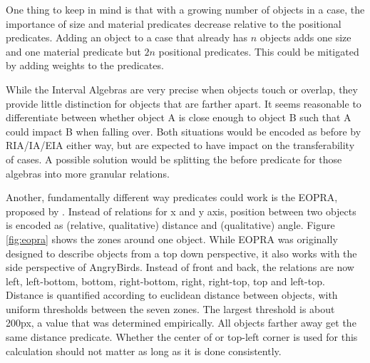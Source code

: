 One thing to keep in mind is that with a growing number of objects in a case, the importance of size and material predicates decrease relative to the positional predicates. Adding an object to a case that already has $n$ objects adds one size and one material predicate but $2n$ positional predicates. This could be mitigated by adding weights to the predicates.

While the Interval Algebras are very precise when objects touch or overlap, they provide little distinction for objects that are farther apart. It seems reasonable to differentiate between whether object A is close enough to object B such that A could impact B when falling over. Both situations would be encoded as before by RIA/IA/EIA either way, but are expected to have impact on the transferability of cases.
A possible solution would be splitting the before predicate for those algebras into more granular relations.

Another, fundamentally different way predicates could work is the \ac{EOPRA}, proposed by \cite{EOPRA-Perico2016CollaborativeCO}. Instead of relations for x and y axis, position between two objects is encoded as (relative, qualitative) distance and (qualitative) angle.
Figure \ref{fig:eopra} shows the zones around one object. While \ac{EOPRA} was originally designed to describe objects from a top down perspective, it also works with the side perspective of AngryBirds.
Instead of front and back, the relations are now left, left-bottom, bottom, right-bottom, right, right-top, top and left-top.
Distance is quantified according to euclidean distance between objects, with uniform thresholds between the seven zones. The largest threshold is about 200px, a value that was determined empirically. All objects farther away get the same distance predicate. Whether the center of or top-left corner is used for this calculation should not matter as long as it is done consistently.


